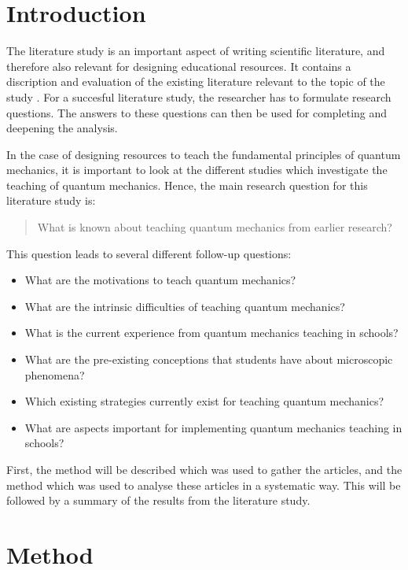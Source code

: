 \documentclass[11pt,twoside]{report} %
\begin{document}
\section{Introduction}

The literature study is an important aspect of writing scientific literature, and therefore also relevant for designing educational resources. It contains a discription and evaluation of the existing literature relevant to the topic of the study \cite{lerencomm}. For a succesful literature study, the researcher has to formulate research questions. The answers to these questions can then be used for completing and deepening the analysis.

In the case of designing resources to teach the fundamental principles of quantum mechanics, it is important to look at the different studies which investigate the teaching of quantum mechanics. Hence, the main research question for this literature study is:

\begin{quote} What is known about teaching quantum mechanics from earlier research? \end{quote}
This question leads to several different follow-up questions:

\begin{itemize}
\item What are the motivations to teach quantum mechanics?
\item What are the intrinsic difficulties of teaching quantum mechanics?
\item What is the current experience from quantum mechanics teaching in schools?
\item What are the pre-existing conceptions that students have about microscopic phenomena?
\item Which existing strategies currently exist for teaching quantum mechanics?
\item What are aspects important for implementing quantum mechanics teaching in schools?
\end{itemize}

First, the method will be described which was used to gather the articles, and the method which was used to analyse these articles in a systematic way. This will be followed by a summary of the results from the literature study.

\section{Method}
\end{document}

